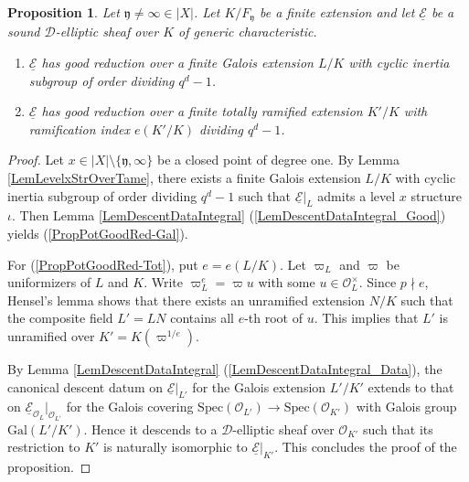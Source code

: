 \documentclass[10pt]{amsart}
\theoremstyle{plain}
\newtheorem{prop}[thm]{Proposition}
\theoremstyle{definition}
\newcommand{\Gal}{\mathrm{Gal}}
\newcommand{\Spec}{\mathrm{Spec}}
\newcommand{\cO}{\mathcal{O}}
\newcommand{\ucE}{\underline{\mathcal{E}}}
\newcommand{\sD}{\mathscr{D}}
\newcommand{\fry}{\mathfrak{y}}
\begin{document}
\begin{prop}\label{PropPotGoodRed}
	Let $\fry\neq \infty\in |X|$.
	Let $K/F_\fry$ be a finite extension and let $\ucE$ be a sound $\sD$-elliptic sheaf over $K$ of generic characteristic.
	\begin{enumerate}
		\item\label{PropPotGoodRed-Gal} $\ucE$ has good reduction over a finite Galois extension $L/K$ with cyclic inertia subgroup of order dividing $q^d-1$.
		\item\label{PropPotGoodRed-Tot} $\ucE$ has good reduction over a finite totally ramified extension $K'/K$ with ramification index $e(K'/K)$ dividing 
		$q^d-1$.
	\end{enumerate}
\end{prop}
\begin{proof}
	Let $x\in |X|\setminus\{\fry,\infty\}$ be a closed point of degree one.
	By Lemma \ref{LemLevelxStrOverTame}, there exists a finite Galois extension $L/K$ with cyclic inertia subgroup 
	of order dividing $q^d-1$ such that
	$\ucE|_L$ admits a level $x$ structure $\iota$. Then 
	Lemma \ref{LemDescentDataIntegral} (\ref{LemDescentDataIntegral_Good}) yields  (\ref{PropPotGoodRed-Gal}).
	
	
	
	For (\ref{PropPotGoodRed-Tot}), put $e=e(L/K)$. Let $\varpi_{L}$ and $\varpi$ be uniformizers of $L$ and $K$. Write $\varpi_{L}^e=\varpi u$ with some $u\in 
	\cO_{L}^\times$.
	Since $p\nmid e$, Hensel's lemma shows that there exists an unramified extension $N/K$ 
	such that the composite field $L'=L N$ contains all $e$-th root of $u$.
	This implies that $L'$ is unramified over $K'=K(\varpi^{1/e})$.
	
	By Lemma \ref{LemDescentDataIntegral} (\ref{LemDescentDataIntegral_Data}), the canonical descent datum on $\ucE|_{L'}$ for the Galois extension $L'/K'$
	extends to that on $\ucE_{\cO_{L}}|_{\cO_{L'}}$ for the Galois covering $\Spec(\cO_{L'})\to \Spec(\cO_{K'})$ with Galois group $\Gal(L'/K')$.
	Hence it descends to a $\sD$-elliptic sheaf over $\cO_{K'}$ such that its restriction to $K'$ is naturally isomorphic to $\ucE|_{K'}$. 
	This concludes the proof of the proposition.
\end{proof}
\end{document}
